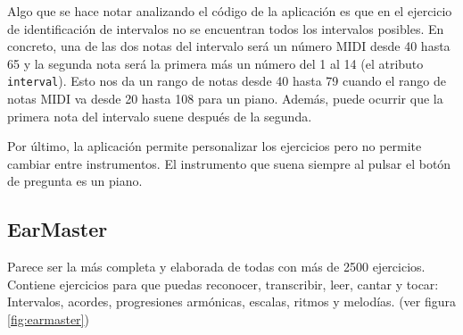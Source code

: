 \documentclass[12pt,twoside,titlepage]{report}
\begin{document}
Algo que se hace notar analizando el código de la aplicación es que en el ejercicio de identificación de intervalos no se encuentran todos los intervalos posibles. En concreto, una de las dos notas del intervalo será un número MIDI desde 40 hasta 65 y la segunda nota será la primera más un número del 1 al 14 (el atributo \texttt{interval}). Esto nos da un rango de notas desde 40 hasta 79 cuando el rango de notas MIDI va desde 20 hasta 108 para un piano. Además, puede ocurrir que la primera nota del intervalo suene después de la segunda.

Por último, la aplicación permite personalizar los ejercicios pero no permite cambiar entre instrumentos. El instrumento que suena siempre al pulsar el botón de pregunta es un piano.

\subsection{EarMaster}

Parece ser la más completa y elaborada de todas con más de 2500 ejercicios. Contiene ejercicios para que puedas reconocer, transcribir, leer, cantar y tocar: Intervalos, acordes, progresiones armónicas, escalas, ritmos y melodías.
(ver figura \ref{fig:earmaster})
\end{document}
